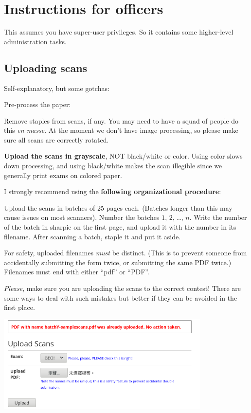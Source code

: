 \chapter{Instructions for officers}
This assumes you have super-user privileges.
So it contains some higher-level administration tasks.

\section{Uploading scans}
Self-explanatory, but some gotchas:
\begin{itemize}
	\ii Pre-process the paper:
	\begin{itemize}
		\ii Remove staples from scans, if any.
		You may need to have a squad of people do this \emph{en masse}.
		\ii At the moment we don't have image processing,
		so please make sure all scans are correctly rotated.
	\end{itemize}

	\ii \textbf{Upload the scans in grayscale}, NOT black/white or color.
	Using color slows down processing, and using black/white makes the scan
	illegible since we generally print exams on colored paper.

	\ii I strongly recommend using the \textbf{following organizational procedure}:
	\begin{itemize}
		\ii Upload the scans in batches of 25 pages each.
		(Batches longer than this may cause issues on most scanners).
		\ii Number the batches $1$, $2$, \dots, $n$.
		Write the number of the batch in sharpie on the first page,
		and upload it with the number in its filename.
		\ii After scanning a batch, staple it and put it aside.
	\end{itemize}

	\ii For safety, uploaded filenames \emph{must} be distinct.
	(This is to prevent someone from accidentally submitting the form twice,
	or submitting the same PDF twice.)
	Filenames must end with either ``pdf'' or ``PDF''.

	\ii \emph{Please}, make sure you are uploading the scans
	to the correct contest!
	There are some ways to deal with such mistakes but better
	if they can be avoided in the first place.
\end{itemize}

\begin{center}
	\includegraphics[width=0.8\textwidth]{images/batchscan.png}
\end{center}

